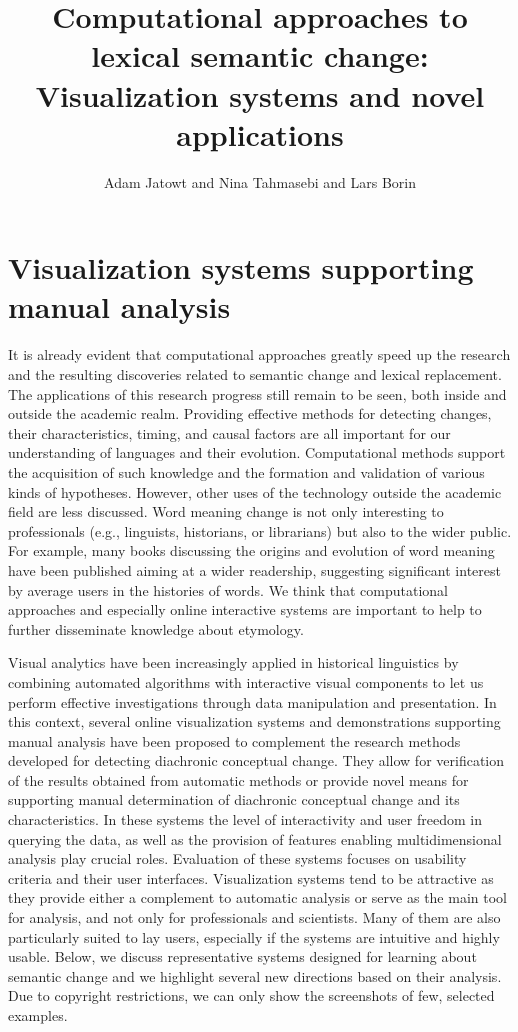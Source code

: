 \documentclass[output=paper]{langsci/langscibook}
\author{Adam Jatowt\affiliation{University of Innsbruck} and
Nina Tahmasebi\affiliation{University of Gothenburg} and
Lars Borin\affiliation{University of Gothenburg}}
\title[Computational approaches: Visualization systems and novel applications]
      {Computational approaches to lexical semantic change: Visualization systems and novel applications}
\begin{document}
\maketitle

\section{Visualization systems supporting manual analysis}
It is already evident that computational approaches greatly speed up the research and the resulting discoveries related to semantic change and lexical replacement. The applications of this research progress still remain to be seen, both inside and outside the academic realm.
Providing effective methods for detecting changes, their characteristics, timing, and causal factors are all important for our understanding of languages and their evolution. Computational methods support the acquisition of such knowledge and the formation and validation of various kinds of hypotheses. However, other uses of the  technology outside the academic field are less discussed. 
Word meaning change is not only interesting to professionals (e.g., linguists, historians, or librarians) but also to the wider public. For example, many books discussing the origins and evolution of word meaning have been published aiming at a wider readership, suggesting significant interest by average users in the histories of words. 
We think that computational approaches and especially online interactive systems are important to help to further disseminate knowledge about  etymology.

\begin{sloppypar}
Visual analytics have been increasingly applied in  historical linguistics \citep{schatzle:hal-02914284} by combining automated algorithms with interactive visual components to let us perform effective investigations through data manipulation and presentation. In this context, several online visualization systems and demonstrations supporting manual analysis have been proposed to complement the research methods developed for detecting diachronic conceptual change. They allow for verification of the results obtained from automatic methods or provide novel means for supporting manual determination of diachronic conceptual change and its characteristics. In these systems the level of interactivity and user freedom in querying the data, as well as the provision of features enabling multidimensional analysis play crucial roles. Evaluation of these systems focuses on usability criteria and their user interfaces. Visualization systems tend to be attractive as they provide either a complement to automatic analysis or serve as the main tool for analysis, and not only for professionals and scientists. Many of them are also particularly suited to lay users, especially if the systems are intuitive and highly usable. Below, we discuss representative  systems designed for learning about semantic change and we highlight several new directions based on their analysis. Due to copyright restrictions, we can only show the screenshots of few, selected examples.
\end{sloppypar}
\end{document}

